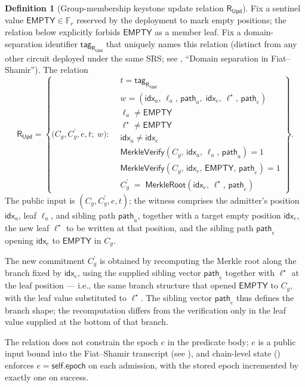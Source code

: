 \documentclass[11pt,a4paper]{article}
\theoremstyle{plain}
\theoremstyle{definition}
\newtheorem{definition}{Definition}
\newcommand{\Fr}{\mathbb{F}_r}
\newcommand{\Cg}{C_g}
\newcommand{\Cgp}{{C_g^{\prime}}}
\newcommand{\RUpd}{\mathsf{R}_{\mathsf{Upd}}}
\newcommand{\Empty}{\mathsf{EMPTY}}
\newcommand{\MerkleVerify}{\mathsf{MerkleVerify}}
\newcommand{\MerkleRoot}{\mathsf{MerkleRoot}}
\newcommand{\Idx}{\mathsf{idx}}
\newcommand{\Pth}{\mathsf{path}}
\begin{document}
\begin{definition}[Group-membership keystone update relation $\RUpd$]
\label{def:rupd}
Fix a sentinel value $\Empty \in \Fr$ reserved by the deployment
to mark empty positions; the relation below explicitly forbids
$\Empty$ as a member leaf. Fix a domain-separation identifier
$\mathsf{tag}_{\RUpd}$ that uniquely names this relation
(distinct from any other circuit deployed under the same SRS;
see , ``Domain separation in Fiat--Shamir''). The
relation
\[
\RUpd
= \left\{\bigl(\Cg, \Cgp, e, t;\; w\bigr) :
\begin{aligned}
   &t = \mathsf{tag}_{\RUpd} \\
   &w = (\Idx_a,\, \ell_a,\, \Pth_a,\;
         \Idx_e,\, \ell^{\star},\, \Pth_e) \\
   &\ell_a \ne \Empty \\
   &\ell^{\star} \ne \Empty \\
   &\Idx_a \ne \Idx_e \\
   &\MerkleVerify(\Cg,\, \Idx_a,\, \ell_a,\, \Pth_a) = 1 \\
   &\MerkleVerify(\Cg,\, \Idx_e,\, \Empty,\, \Pth_e) = 1 \\
   &\Cgp \;=\; \MerkleRoot(\Idx_e,\, \ell^{\star},\, \Pth_e)
\end{aligned}\right\}.
\]
The public input is $(\Cg, \Cgp, e, t)$; the witness comprises
the admitter's position $\Idx_a$, leaf $\ell_a$, and sibling
path $\Pth_a$, together with a target empty position $\Idx_e$,
the new leaf $\ell^{\star}$ to be written at that position, and
the sibling path $\Pth_e$ opening $\Idx_e$ to $\Empty$ in $\Cg$.

The new commitment $\Cgp$ is obtained by recomputing the Merkle
root along the branch fixed by $\Idx_e$, using the supplied
sibling vector $\Pth_e$ together with $\ell^{\star}$ at the leaf
position --- i.e., the same branch structure that opened $\Empty$
to $\Cg$, with the leaf value substituted to $\ell^{\star}$. The
sibling vector $\Pth_e$ thus defines the branch shape; the
recomputation differs from the verification only in the leaf
value supplied at the bottom of that branch.

The relation does not constrain the epoch $e$ in the predicate
body; $e$ is a public input bound into the Fiat--Shamir
transcript (see ), and chain-level state
() enforces $e = \mathsf{self.epoch}$ on each
admission, with the stored epoch incremented by exactly one on
success.
\end{definition}
\end{document}
